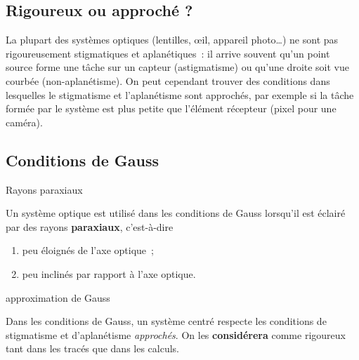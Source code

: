\documentclass[../main/main.tex]{subfiles}
\begin{document}
\subsection{Rigoureux ou approché ?}

La plupart des systèmes optiques (lentilles, œil, appareil photo…) ne sont pas
rigoureusement stigmatiques et aplanétiques~: il arrive souvent qu'un point
source forme une tâche sur un capteur (astigmatisme) ou qu'une droite soit vue
courbée (non-aplanétisme). On peut cependant trouver des conditions
dans lesquelles le stigmatisme et l'aplanétisme sont approchés, par exemple si
la tâche formée par le système est plus petite que l'élément récepteur (pixel
pour une caméra).

\subsection{Conditions de Gauss}

\begin{tcbraster}[raster columns=2, raster equal height=rows]
    
    \begin{defi}[label=def:gausscond]{Rayons paraxiaux}

        Un système optique est utilisé dans les conditions de Gauss lorsqu'il
        est éclairé par des rayons \textbf{paraxiaux}, c'est-à-dire

        \begin{enumerate}
            \item peu éloignés de l'axe optique~;
            \item peu inclinés par rapport à l'axe optique.
        \end{enumerate}
    \end{defi}
    \begin{prop}[label=prop:gaussprop]{approximation de Gauss}
    
        Dans les conditions de Gauss, un système centré respecte les conditions
        de stigmatisme et d'aplanétisme \textit{approchés}. On les
        \textbf{considérera} comme rigoureux tant dans les tracés que dans les
        calculs.
    
    \end{prop}
\end{tcbraster}

\end{document}
